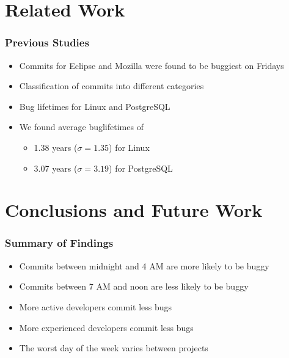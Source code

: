 \documentclass[aspectratio=169]{beamer}
\begin{document}
\section{Related Work}
\begin{frame}
  \frametitle{Previous Studies}

  \begin{itemize}
    \item Commits for Eclipse and Mozilla were found to be buggiest on Fridays \cite{sliwerski-msr-2005}

    \item Classification of commits into different categories \cite{largeCommits}

    \item Bug lifetimes for Linux and PostgreSQL \cite{deviant,2006-long}

    \item We found average buglifetimes of

    \begin{itemize}
      \item 1.38 years ($\sigma = 1.35$) for Linux

      \item 3.07 years ($\sigma = 3.19$) for PostgreSQL
    \end{itemize}
  \end{itemize}
\end{frame}

\section{Conclusions and Future Work}
\begin{frame}
  \frametitle{Summary of Findings}
  
  \begin{itemize}
    \item Commits between midnight and 4 AM are more likely to be buggy

    \item Commits between 7 AM and noon are less likely to be buggy

    \item More active developers commit less bugs

    \item More experienced developers commit less bugs

    \item The worst day of the week varies between projects
  \end{itemize}
\end{frame}
\end{document}
